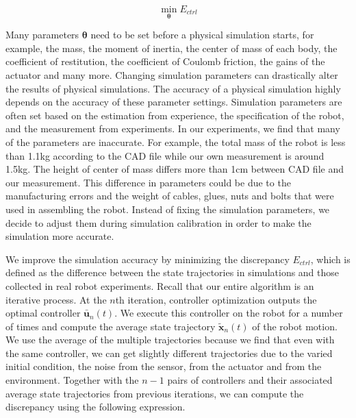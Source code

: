 \begin{equation}
 \min_{\mathbf{\theta}} E_{ctrl}
\label{eqn:calibration}
\end{equation}

Many parameters $\mathbf{\theta}$ need to be set before a physical simulation starts, for example, the mass, the moment of inertia, the center of mass of each body, the coefficient of restitution, the coefficient of Coulomb friction, the gains of the actuator and many more. Changing simulation parameters can drastically alter the results of physical simulations. The accuracy of a physical simulation highly depends on the accuracy of these parameter settings. Simulation parameters are often set based on the estimation from experience, the specification of the robot, and the measurement from experiments. In our experiments, we find that many of the parameters are inaccurate. For example, the total mass of the robot is less than 1.1kg according to the CAD file while our own measurement is around 1.5kg. The height of center of mass differs more than 1cm between CAD file and our measurement. This difference in parameters could be due to the manufacturing errors and the weight of cables, glues, nuts and bolts that were used in assembling the robot. Instead of fixing the simulation parameters, we decide to adjust them during simulation calibration in order to make the simulation more accurate.

We improve the simulation accuracy by minimizing the discrepancy $E_{ctrl}$, which is defined as the difference between the state trajectories in simulations and those collected in real robot experiments. Recall that our entire algorithm is an iterative process. At the $n$th iteration, controller optimization outputs the optimal controller $\bar{\mathbf{u}}_n(t)$. We execute this controller on the robot for a number of times and compute the average state trajectory $\tilde{\mathbf{x}}_n(t)$ of the robot motion. We use the average of the multiple trajectories because we find that even with the same controller, we can get slightly different trajectories due to the varied initial condition, the noise from the sensor, from the actuator and from the environment. Together with the $n-1$ pairs of controllers and their associated average state trajectories from previous iterations, we can compute the discrepancy using the following expression. 

